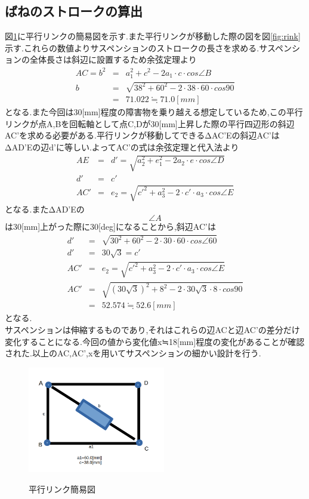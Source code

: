 \documentclass[12pt,oneside]{sotsuken_paper}
\begin{document}
\subsection{ばねのストロークの算出}
図\ref{fig:bix}に平行リンクの簡易図を示す.また平行リンクが移動した際の図を図\ref{fig:rink}示す.これらの数値よりサスペンションのストロークの長さを求める.サスペンションの全体長さは斜辺に設置するため余弦定理より
\begin{eqnarray}
   AC = b^2 & = & a_1^2+c^2-2a_1\cdot c\cdot cos\angle B \\
  b & = & \sqrt{38^2+60^2-2\cdot 38\cdot 60\cdot cos90} \\
    & = &71.022 ≒　71.0[mm]
\end{eqnarray}
となる.また今回は30[mm]程度の障害物を乗り越える想定しているため,この平行リンクが点A,Bを回転軸として点C,Dが30[mm]上昇した際の平行四辺形の斜辺AC'を求める必要がある.平行リンクが移動してできるΔAC'Eの斜辺AC'はΔAD'Eの辺d'に等しい.よってAC'の式は余弦定理と代入法より
\begin{eqnarray}
	AE& = &d' =  \sqrt{a_2^2+e_1^2-2a_2\cdot e\cdot cos\angle D} \\
	d' & = & c' \\
	AC'&= &e_2  =  \sqrt{c'^2+a_3^2-2\cdot c'\cdot a_3\cdot cos\angle E}
\end{eqnarray}
となる.またΔAD'Eの\[\angle A\]は30[mm]上がった際に30[deg]になることから,斜辺AC'は
\begin{eqnarray}
	d' &=& \sqrt{30^2+60^2-2\cdot 30\cdot 60\cdot cos\angle 60} \\
	d'&=&30\sqrt{3}=c' \\
	AC'&= &e_2  =  \sqrt{c'^2+a_3^2-2\cdot c'\cdot a_3\cdot cos\angle E}  \\
	AC' &=& \sqrt{(30\sqrt{3})^2+8^2-2\cdot 30\sqrt{3}\cdot 8\cdot cos90} \\
	& = & 52.574 ≒ 52.6 [mm]
\end{eqnarray}
となる.　\\
サスペンションは伸縮するものであり,それはこれらの辺ACと辺AC'の差分だけ変化することになる.今回の値から変化値x≒18[mm]程度の変化があることが確認された.以上のAC,AC',xを用いてサスペンションの細かい設計を行う.

\begin{figure}[htp]
 \begin{center}
  \includegraphics[width=60mm]{img/hard/fig5.png}
 　\caption{平行リンク簡易図}
  \label{fig:bix}%
 \end{center}
\end{figure}
\end{document}
